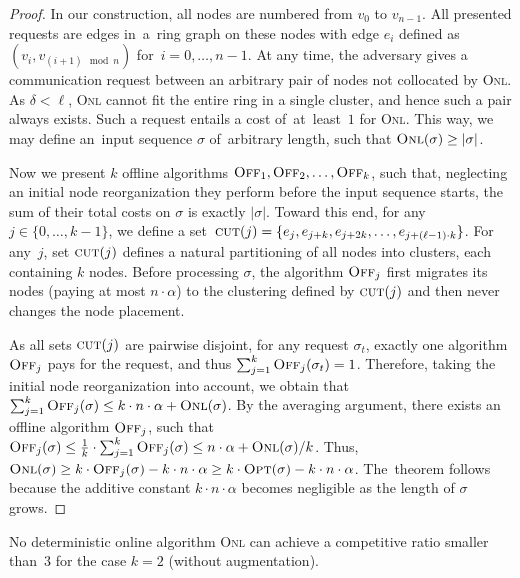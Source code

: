 \documentclass{siamart190516}
\newcommand{\ONL}{\textsc{Onl}\xspace}
\newcommand{\OFF}{\textsc{Off}\xspace}
\newcommand{\OPT}{\textsc{Opt}\xspace}
\newcommand{\cut}{\textsc{cut}}
\begin{document}
\begin{proof}
In our construction, all nodes are numbered from $v_0$ to $v_{n-1}$. All
presented requests are edges in~a~ring graph on these nodes with edge $e_i$
defined as $(v_i,v_{(i+1) \mod n })$ for~$i = 0, \ldots, n-1$. At any time,
the adversary gives a communication request between an arbitrary pair of nodes
not collocated by \ONL. As $\delta < \ell$, \ONL cannot fit the entire ring in
a single cluster, and hence such a pair always exists. Such a request
entails a cost of~at~least~$1$ for \ONL. This way, we may define an~input
sequence $\sigma$ of~arbitrary length, such that $\ONL(\sigma) \geq
|\sigma|$.

Now we present $k$ offline algorithms $\OFF_1, \OFF_2, \ldots, \OFF_k$, such
that, neglecting an initial node reorganization they perform before
the input sequence starts, the sum of their total costs on $\sigma$ is exactly
$|\sigma|$. Toward this end, for any $j \in \{0,\ldots,k-1\}$, we define a
set~$\cut(j) = \{ e_j, e_{j+k}, e_{j+2k},
\ldots, e_{j+(\ell-1)\cdot k} \}$. For any~$j$, set $\cut(j)$ defines a
natural partitioning of all nodes into clusters, each containing $k$ nodes.
Before processing $\sigma$, the algorithm $\OFF_j$ first migrates its nodes
(paying at most $n \cdot \alpha$) to the clustering defined by $\cut(j)$ and
then never changes the node placement.

As all sets $\cut(j)$ are pairwise disjoint, for any request $\sigma_t$,
exactly one algorithm $\OFF_j$ pays for the request, and thus $\sum_{j=1}^k
\OFF_j(\sigma_t) = 1$. Therefore, taking the initial node reorganization into
account, we obtain that $\sum_{j=1}^k \OFF_j(\sigma) \leq k \cdot n \cdot
\alpha + \ONL(\sigma)$. By the averaging argument, there exists an offline
algorithm $\OFF_j$, such that $\OFF_j(\sigma) \leq \frac{1}{k} \cdot
\sum_{j=1}^k \OFF_j(\sigma) \leq n \cdot \alpha + \ONL(\sigma) / k$.
Thus, $\ONL(\sigma) \geq k \cdot \OFF_j(\sigma) - k \cdot n \cdot
\alpha \geq k \cdot \OPT(\sigma) - k \cdot n \cdot \alpha$.
The~theorem follows because the additive constant $k \cdot n \cdot \alpha$
becomes negligible as the length of $\sigma$ grows.
\end{proof}


\begin{theorem}
No deterministic online algorithm \ONL can achieve a competitive ratio 
smaller than~$3$ for the case $k = 2$ (without augmentation).
\end{theorem}
\end{document}
